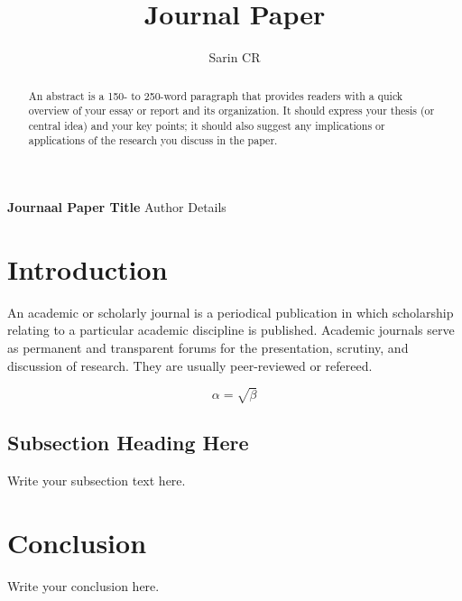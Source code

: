 \documentclass[11pt]{article}
\begin{document}
\title{Journal Paper{}}
\author{Sarin CR}


\begin{center}
\centering
{
\textbf{\Huge{Journaal Paper Title}}
\newline
\newline
\LARGE Author Details\par
}
\end{center}

\begin{abstract}
An abstract is a 150- to 250-word paragraph that provides readers with a quick overview of your essay or report and its organization. It should express your thesis (or central idea) and your key points; it should also suggest any implications or applications of the research you discuss in the paper.
\end{abstract}

 
\section{Introduction}
An academic or scholarly journal is a periodical publication in which scholarship relating to a particular academic discipline is published. Academic journals serve as permanent and transparent forums for the presentation, scrutiny, and discussion of research. They are usually peer-reviewed or refereed.

\begin{equation}
    \label{simple_equation}
    \alpha = \sqrt{ \beta }
\end{equation}


\subsection{Subsection Heading Here}
Write your subsection text here.


\section{Conclusion}
Write your conclusion here.

 
 
\end{document}
